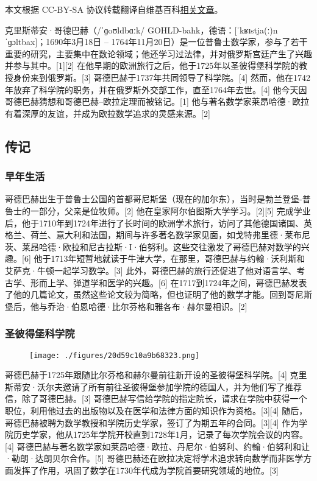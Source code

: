 
本文根据 CC-BY-SA 协议转载翻译自维基百科\href{https://en.wikipedia.org/wiki/Christian_Goldbach}{相关文章}。

克里斯蒂安·哥德巴赫（/ˈɡoʊldbɑːk/ GOHLD-bahk，德语：[ˈkʁɪsti̯a(ː)n ˈɡɔltbax]；1690年3月18日 – 1764年11月20日）是一位普鲁士数学家，参与了若干重要的研究，主要集中在数论领域；他还学习过法律，并对俄罗斯宫廷产生了兴趣并参与其中。[1][2] 在他早期的欧洲旅行之后，他于1725年以圣彼得堡科学院的教授身份来到俄罗斯。[3] 哥德巴赫于1737年共同领导了科学院。[4] 然而，他在1742年放弃了科学院的职务，并在俄罗斯外交部工作，直至1764年去世。[4] 他今天因哥德巴赫猜想和哥德巴赫–欧拉定理而被铭记。[1] 他与著名数学家莱昂哈德·欧拉有着深厚的友谊，并成为欧拉数学追求的灵感来源。[2]
\subsection{传记}  
\subsubsection{早年生活}  
哥德巴赫出生于普鲁士公国的首都哥尼斯堡（现在的加尔东），当时是勃兰登堡-普鲁士的一部分，父亲是位牧师。[2] 他在皇家阿尔伯图斯大学学习。[2][5] 完成学业后，他于1710年到1724年进行了长时间的欧洲学术旅行，访问了其他德国诸国、英格兰、荷兰、意大利和法国，期间与许多著名数学家见面，如戈特弗里德·莱布尼茨、莱昂哈德·欧拉和尼古拉斯·I·伯努利。这些交往激发了哥德巴赫对数学的兴趣。[6] 他于1713年短暂地就读于牛津大学，在那里，哥德巴赫与约翰·沃利斯和艾萨克·牛顿一起学习数学。[3] 此外，哥德巴赫的旅行还促进了他对语言学、考古学、形而上学、弹道学和医学的兴趣。[6] 在1717到1724年之间，哥德巴赫发表了他的几篇论文，虽然这些论文较为简略，但也证明了他的数学才能。回到哥尼斯堡后，他与乔治·伯恩哈德·比尔芬格和雅各布·赫尔曼相识。[2]
\subsubsection{圣彼得堡科学院}
\begin{figure}[ht]
\centering
\texttt{[image: ./figures/20d59c10a9b68323.png]}
\caption{} \label{fig_Goldba_1}
\end{figure}
哥德巴赫于1725年跟随比尔芬格和赫尔曼前往新开设的圣彼得堡科学院。[4] 克里斯蒂安·沃尔夫邀请了所有前往圣彼得堡参加学院的德国人，并为他们写了推荐信，除了哥德巴赫。[3] 哥德巴赫写信给学院的指定院长，请求在学院中获得一个职位，利用他过去的出版物以及在医学和法律方面的知识作为资格。[3][4] 随后，哥德巴赫被聘为数学教授和学院历史学家，签订了为期五年的合同。[3][4] 作为学院历史学家，他从1725年学院开校直到1728年1月，记录了每次学院会议的内容。[4] 哥德巴赫与著名数学家如莱昂哈德·欧拉、丹尼尔·伯努利、约翰·伯努利和让·勒朗·达朗贝尔合作。[5] 哥德巴赫还在欧拉决定将学术追求转向数学而非医学方面发挥了作用，巩固了数学在1730年代成为学院首要研究领域的地位。[3]

